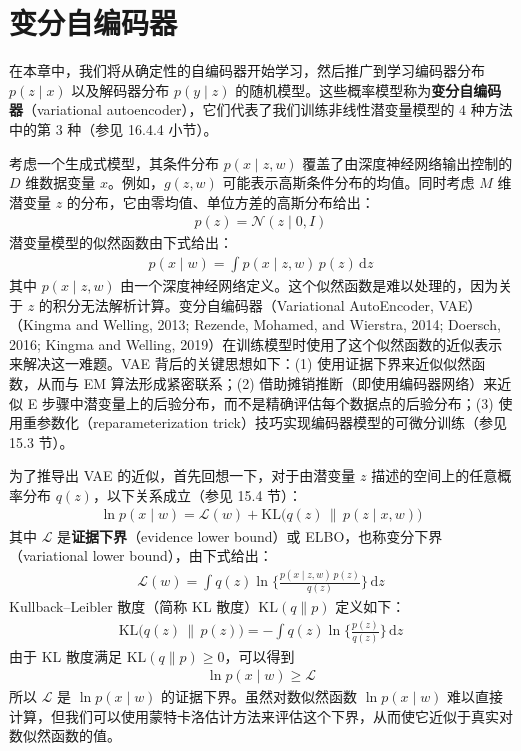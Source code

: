 \documentclass[../../main.tex]{subfiles}
\begin{document}
\section{变分自编码器}\label{section:ch19-变分自编码器}

在本章中，我们将从确定性的自编码器开始学习，然后推广到学习编码器分布 $p(z\mid x)$ 以及解码器分布 $p(y\mid z)$ 的随机模型。这些概率模型称为\textbf{变分自编码器}（variational autoencoder），它们代表了我们训练非线性潜变量模型的 $4$ 种方法中的第 $3$ 种（参见 16.4.4 小节）。

考虑一个生成式模型，其条件分布 $p(x\mid z,w)$ 覆盖了由深度神经网络输出控制的 $D$ 维数据变量 $x$。例如，$g(z,w)$ 可能表示高斯条件分布的均值。同时考虑 $M$ 维潜变量 $z$ 的分布，它由零均值、单位方差的高斯分布给出：
\begin{align}
p(z)=\mathcal{N}(z\mid 0,I)
\label{align:ch19-pz}
\end{align}
潜变量模型的似然函数由下式给出：
\begin{align}
p(x\mid w)=\int p(x\mid z,w)\,p(z)\,\mathrm{d}z
\label{align:ch19-marginal}
\end{align}
其中 $p(x\mid z,w)$ 由一个深度神经网络定义。这个似然函数是难以处理的，因为关于 $z$ 的积分无法解析计算。变分自编码器（Variational AutoEncoder, VAE）（Kingma and Welling, 2013; Rezende, Mohamed, and Wierstra, 2014; Doersch, 2016; Kingma and Welling, 2019）在训练模型时使用了这个似然函数的近似表示来解决这一难题。VAE 背后的关键思想如下：(1) 使用证据下界来近似似然函数，从而与 EM 算法形成紧密联系；(2) 借助摊销推断（即使用编码器网络）来近似 E 步骤中潜变量上的后验分布，而不是精确评估每个数据点的后验分布；(3) 使用重参数化（reparameterization trick）技巧实现编码器模型的可微分训练（参见 15.3 节）。

为了推导出 VAE 的近似，首先回想一下，对于由潜变量 $z$ 描述的空间上的任意概率分布 $q(z)$，以下关系成立（参见 15.4 节）：
\begin{align}
\ln p(x\mid w)=\mathcal{L}(w)+\mathrm{KL}\big(q(z)\,\|\,p(z\mid x,w)\big)
\label{align:ch19-elbo-decomp}
\end{align}
其中 $\mathcal{L}$ 是\textbf{证据下界}（evidence lower bound）或 ELBO，也称变分下界（variational lower bound），由下式给出：
\begin{align}
\mathcal{L}(w)=\int q(z)\ln\Big\{\frac{p(x\mid z,w)\,p(z)}{q(z)}\Big\}\,\mathrm{d}z
\label{align:ch19-elbo}
\end{align}
Kullback--Leibler 散度（简称 KL 散度）$\mathrm{KL}(q\|p)$ 定义如下：
\begin{align}
\mathrm{KL}\big(q(z)\,\|\,p(z)\big)=-\int q(z)\ln\Big\{\frac{p(z)}{q(z)}\Big\}\,\mathrm{d}z
\label{align:ch19-kl}
\end{align}
由于 KL 散度满足 $\mathrm{KL}(q\|p)\ge 0$，可以得到
\begin{align}
\ln p(x\mid w)\ge \mathcal{L}
\label{align:ch19-elbo-lower}
\end{align}
所以 $\mathcal{L}$ 是 $\ln p(x\mid w)$ 的证据下界。虽然对数似然函数 $\ln p(x\mid w)$ 难以直接计算，但我们可以使用蒙特卡洛估计方法来评估这个下界，从而使它近似于真实对数似然函数的值。
\end{document}
